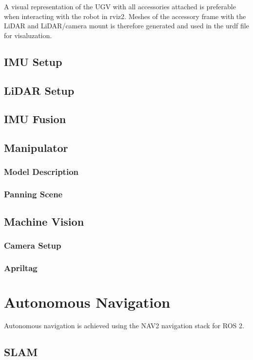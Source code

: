 A visual representation of the UGV with all accessories attached is preferable when interacting with the robot in rviz2. Meshes of the accessory frame with the LiDAR and LiDAR/camera mount is therefore generated and used in the urdf file for visaluzation. 



\subsection{IMU Setup}

\subsection{LiDAR Setup}

\subsection{IMU Fusion}

\subsection{Manipulator}
\subsubsection{Model Description}
\subsubsection{Panning Scene}

\subsection{Machine Vision}
\subsubsection{Camera Setup}
\subsubsection{Apriltag}


\section{Autonomous Navigation}
Autonomous navigation is achieved using the NAV2 navigation stack for ROS 2.

\subsection{SLAM}

